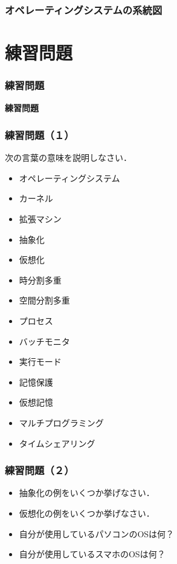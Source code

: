 \documentclass[unicode]{beamer}                   %
\begin{document}
\begin{frame}
  \frametitle{オペレーティングシステムの系統図}
  \vfill
\end{frame}

\section{練習問題}
\begin{frame}
  \frametitle{練習問題}
  \vfill
  \begin{center}
    \textbf{\Huge 練習問題}
  \end{center}
  \vfill
\end{frame}

\begin{frame}
  \frametitle{練習問題（１）}
  次の言葉の意味を説明しなさい．
  \begin{itemize}
    \item オペレーティングシステム
    \item カーネル
    \item 拡張マシン
    \item 抽象化
    \item 仮想化
    \item 時分割多重
    \item 空間分割多重
    \item プロセス
    \item バッチモニタ
    \item 実行モード
    \item 記憶保護
    \item 仮想記憶
    \item マルチプログラミング
    \item タイムシェアリング
  \end{itemize}
  \vfill
\end{frame}

\begin{frame}
  \frametitle{練習問題（２）}
  \begin{itemize}
    \item 抽象化の例をいくつか挙げなさい．
      \vfill
    \item 仮想化の例をいくつか挙げなさい．
      \vfill
    \item 自分が使用しているパソコンのOSは何？
      \vfill
    \item 自分が使用しているスマホのOSは何？
      \vfill
  \end{itemize}
  \vfill
\end{frame}
\end{document}
